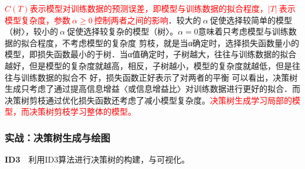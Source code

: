 \textcolor{red}{ $C(T)$表示模型对训练数据的预测误差，即模型与训练数据的拟合程度，$|T|~$表示模型复杂度，参数$~\alpha\geq 0~$控制两者之间的影响}．较大的$~\alpha~$促使选择较简单的模型（树〉，较小的$~\alpha~ $促使选择较复杂的模型（树〉。$\alpha=0$意味着只考虑模型与训练数据的拟合程度，不考虑模型的复杂度
剪枝，就是当α确定时，选择损失函数量小的模型，即损失函数最小的于树．当α值确定时，子树越大，往往与训练数据的拟合越好，但是模型的复杂度就越高，相反，子树越小，模型的复杂度就越低，但是往往与训练数据的拟合不 好，损失函数正好表示了对两者的平衡
可以看出，决策树生成只考虑了通过提高信息增益〈或信息增益比〉对训练数据进行更好的拟合．而决策树剪枝通过优化损失函数还考虑了减小模型复杂度。\textcolor{red}{决策树生成学习局部的模型，而决策树剪枝学习整体的模型。}
\subsubsection{实战：决策树生成与绘图}

\textbf{ID3}~~利用ID3算法进行决策树的构建，与可视化。

